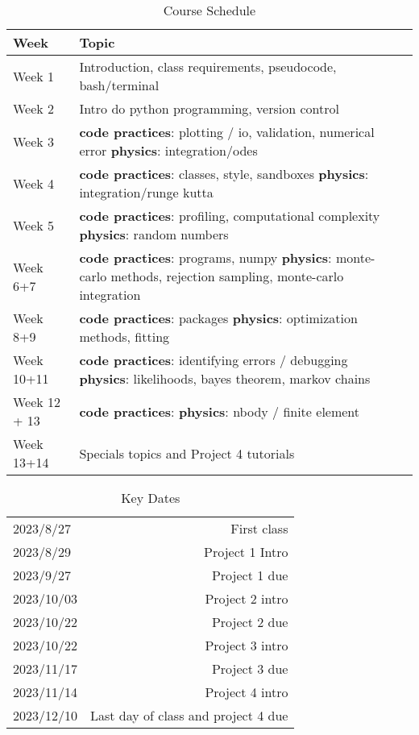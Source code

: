\documentclass[12pt]{article}
\begin{document}
\begin{table}[h]
  \caption{Course Schedule}
\begin{center}
  \begin{tabular}{|p{3cm}|m{10cm} | @{}m{0pt}@{}}
     \toprule
     \textbf{Week} & \textbf{Topic} \\\hline
    Week 1 & Introduction, class requirements, pseudocode, bash/terminal \\ \hline
    Week 2 & Intro do python programming, version control \\
    Week 3 & \textbf{code practices}: plotting / io, validation, numerical error \textbf{physics}: integration/odes \\\hline
    Week 4 & \textbf{code practices}: classes, style, sandboxes \textbf{physics}: integration/runge kutta \\\hline
    Week 5 & \textbf{code practices}: profiling, computational complexity \textbf{physics}: random numbers \\\hline
    Week 6+7 & \textbf{code practices}: programs, numpy \textbf{physics}: monte-carlo methods, rejection sampling, monte-carlo integration \\\hline
    Week 8+9 & \textbf{code practices}: packages \textbf{physics}: optimization methods, fitting \\\hline
    Week 10+11 & \textbf{code practices}: identifying errors / debugging \textbf{physics}: likelihoods, bayes theorem, markov chains \\\hline
    Week 12 + 13 & \textbf{code practices}: \textbf{physics}: nbody / finite element \\\hline
    Week 13+14 & Specials topics and Project 4 tutorials \\
    \bottomrule
  \end{tabular}
\end{center}
\end{table}

\begin{table}[h]
  \caption{Key Dates}
\begin{center}
  \begin{tabular}{l|r}
    \toprule
    2023/8/27 & First class \\
    2023/8/29 & Project 1 Intro \\
    2023/9/27 & Project 1 due \\
    2023/10/03 & Project 2 intro \\
    2023/10/22 & Project 2 due \\
    2023/10/22 & Project 3 intro \\
    2023/11/17 & Project 3 due \\
    2023/11/14 & Project 4 intro \\
    2023/12/10 & Last day of class and project 4 due \\
    \bottomrule
  \end{tabular}
\end{center}
\end{table}
\end{document}
